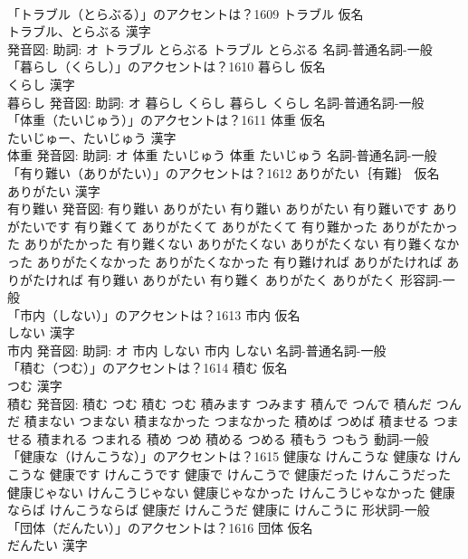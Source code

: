 \documentclass[8pt]{extreport}
\begin{document}
\begin{CJK}{UTF8}{min}
\\	「トラブル（とらぶる）」のアクセントは？1609	トラブル 仮名　
\\	トラブル、とらぶる 漢字　
\\	発音図: 助詞: オ	トラブル とらぶる		トラブル とらぶる				名詞-普通名詞-一般 
\\	「暮らし（くらし）」のアクセントは？1610	暮らし 仮名　
\\	くらし 漢字　
\\	暮らし 発音図: 助詞: オ	暮らし くらし		暮らし くらし				名詞-普通名詞-一般 
\\	「体重（たいじゅう）」のアクセントは？1611	体重 仮名　
\\	たいじゅー、たいじゅう 漢字　
\\	体重 発音図: 助詞: オ	体重 たいじゅう		体重 たいじゅう				名詞-普通名詞-一般 
\\	「有り難い（ありがたい）」のアクセントは？1612	ありがたい｛有難｝ 仮名　
\\	ありがたい 漢字　
\\	有り難い 発音図:	有り難い ありがたい		有り難い ありがたい 有り難いです ありがたいです 有り難くて ありがたくて ありがたくて 有り難かった ありがたかった ありがたかった 有り難くない ありがたくない ありがたくない 有り難くなかった ありがたくなかった ありがたくなかった 有り難ければ ありがたければ ありがたければ 有り難い ありがたい 有り難く ありがたく ありがたく				形容詞-一般 
\\	「市内（しない）」のアクセントは？1613	市内 仮名　
\\	しない 漢字　
\\	市内 発音図: 助詞: オ	市内 しない		市内 しない				名詞-普通名詞-一般 
\\	「積む（つむ）」のアクセントは？1614	積む 仮名　
\\	つむ 漢字　
\\	積む 発音図:	積む つむ		積む つむ 積みます つみます 積んで つんで 積んだ つんだ 積まない つまない 積まなかった つまなかった 積めば つめば 積ませる つませる 積まれる つまれる 積め つめ 積める つめる 積もう つもう				動詞-一般 
\\	「健康な（けんこうな）」のアクセントは？1615		健康な けんこうな		健康な けんこうな 健康です けんこうです 健康で けんこうで 健康だった けんこうだった 健康じゃない けんこうじゃない 健康じゃなかった けんこうじゃなかった 健康ならば けんこうならば 健康だ けんこうだ 健康に けんこうに				形状詞-一般 
\\	「団体（だんたい）」のアクセントは？1616	団体 仮名　
\\	だんたい 漢字　

\end{CJK}
\end{document}

